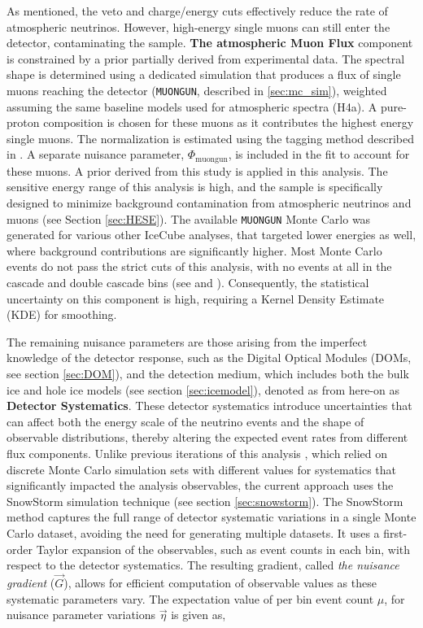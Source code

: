 As mentioned, the veto and charge/energy cuts effectively reduce the rate of atmospheric neutrinos. However, high-energy single muons can still enter the detector, contaminating the sample. \textbf{The atmospheric Muon Flux} component is constrained by a prior partially derived from experimental data. The spectral shape is determined using a dedicated simulation that produces a flux of single muons reaching the detector (\texttt{MUONGUN}, described in \ref{sec:mc_sim}), weighted assuming the same baseline models used for atmospheric spectra (H4a). A pure-proton composition is chosen for these muons as it contributes the highest energy single muons. The normalization is estimated using the tagging method described in \cite{HESE7_sample}. A separate nuisance parameter, $\Phi_{\mathrm{muongun}}$, is included in the fit to account for these muons. A prior derived from this study is applied in this analysis. The sensitive energy range of this analysis is high, and the sample is specifically designed to minimize background contamination from atmospheric neutrinos and muons (see Section \ref{sec:HESE}). The available \texttt{MUONGUN} Monte Carlo was generated for various other IceCube analyses, that targeted lower energies as well, where background contributions are significantly higher. Most Monte Carlo events do not pass the strict cuts of this analysis, with no events at all in the cascade and double cascade bins (see  and ). Consequently, the statistical uncertainty on this component is high, requiring a Kernel Density Estimate (KDE) for smoothing.

The remaining nuisance parameters are those arising from the imperfect knowledge of the detector response, such as the Digital Optical Modules (DOMs, see section \ref{sec:DOM}), and the detection medium, which includes both the bulk ice and hole ice models (see section \ref{sec:icemodel}), denoted as from here-on as \textbf{Detector Systematics}. These detector systematics introduce uncertainties that can affect both the energy scale of the neutrino events and the shape of observable distributions, thereby altering the expected event rates from different flux components. Unlike previous iterations of this analysis , which relied on discrete Monte Carlo simulation sets with different values for systematics that significantly impacted the analysis observables, the current approach uses the SnowStorm simulation technique (see section \ref{sec:snowstorm}). The SnowStorm method  captures the full range of detector systematic variations in a single Monte Carlo dataset, avoiding the need for generating multiple datasets. It uses a first-order Taylor expansion of the observables, such as event counts in each bin, with respect to the detector systematics. The resulting gradient, called \emph{the nuisance gradient} ($\vec{G}$), allows for efficient computation of observable values as these systematic parameters vary. The expectation value of per bin event count $\mu$, for nuisance parameter variations $\vec{\eta}$ is given as,

